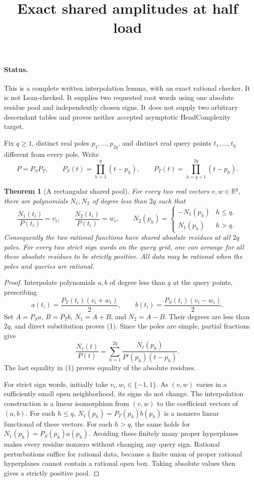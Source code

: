 \documentclass[11pt]{article}
\title{Exact shared amplitudes at half load}
\author{}\date{}
\newtheorem{theorem}{Theorem}
\begin{document}
\maketitle

\paragraph{Status.}
This is a complete written interpolation lemma, with an exact rational
checker. It is not Lean-checked. It supplies two requested root words
using one absolute residue pool and independently chosen signs. It
does not supply two arbitrary descendant tables and proves neither
accepted asymptotic HeadComplexity target.

Fix $q\geq1$, distinct real poles $p_1,\ldots,p_{2q}$, and distinct
real query points $t_1,\ldots,t_q$ different from every pole. Write
\[
 P=P_S P_T,\qquad
 P_S(t)=\prod_{h=1}^q(t-p_h),\qquad
 P_T(t)=\prod_{h=q+1}^{2q}(t-p_h).
\]

\begin{theorem}[A rectangular shared pool]
For every two real vectors $v,w\in\mathbb R^q$, there are polynomials
$N_1,N_2$ of degree less than $2q$ such that
\[
 \frac{N_1(t_i)}{P(t_i)}=v_i,\qquad
 \frac{N_2(t_i)}{P(t_i)}=w_i,
 \qquad N_2(p_h)=\begin{cases}-N_1(p_h)&h\leq q,\\
                              N_1(p_h)&h>q.\end{cases}       \tag{1}
\]
Consequently the two rational functions have shared absolute residues
at all $2q$ poles. For every two strict sign words on the query grid,
one can arrange for all these absolute residues to be strictly positive.
All data may be rational when the poles and queries are rational.
\end{theorem}
\begin{proof}
Interpolate polynomials $a,b$ of degree less than $q$ at the query
points, prescribing
\[
 a(t_i)=\frac{P_T(t_i)(v_i+w_i)}2,\qquad
 b(t_i)=\frac{P_S(t_i)(v_i-w_i)}2.
\]
Set $A=P_Sa$, $B=P_Tb$, $N_1=A+B$, and $N_2=A-B$.
Their degrees are less than $2q$, and direct substitution proves
(1). Since the poles are simple, partial fractions give
\[
 \frac{N_\ell(t)}{P(t)}
   =\sum_{h=1}^{2q}\frac{N_\ell(p_h)}{P'(p_h)(t-p_h)}.
\]
The last equality in (1) proves equality of the absolute residues.

For strict sign words, initially take $v_i,w_i\in\{-1,1\}$.
As $(v,w)$ varies in a sufficiently small open neighborhood, its
signs do not change. The interpolation construction is a linear
isomorphism from $(v,w)$ to the coefficient vectors of $(a,b)$.
For each $h\leq q$, $N_1(p_h)=P_T(p_h)b(p_h)$ is a nonzero
linear functional of these vectors. For each $h>q$, the same holds
for $N_1(p_h)=P_S(p_h)a(p_h)$. Avoiding these finitely many proper
hyperplanes makes every residue nonzero without changing any query
sign. Rational perturbations suffice for rational data, because a
finite union of proper rational hyperplanes cannot contain a rational
open box. Taking absolute values then gives a strictly positive pool.
\end{proof}
\end{document}
